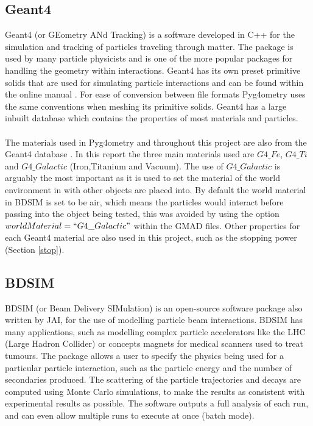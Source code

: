 \documentclass[12pt,a4paper]{article}
\begin{document}
\subsection{Geant4}\label{geant4}
\label{g4}
Geant4 (or GEometry ANd Tracking) is a software developed in C++ for the simulation and tracking of particles traveling through matter. The package is used by many particle physicists and is one of the more popular packages for handling the geometry within interactions. Geant4 has its own preset primitive solids that are used for simulating particle interactions and can be found within the online manual \cite{solids}. For ease of conversion between file formats Pyg4ometry uses the same conventions when meshing its primitive solids. Geant4 has a large inbuilt database which contains the properties of most materials and particles.
\\\\
The materials used in Pyg4ometry and throughout this project are also from the Geant4 database \cite{mater}. In this report the three main materials used are $G4\_Fe$, $G4\_Ti$ and $G4\_Galactic$ (Iron,Titanium and Vacuum). The use of $G4\_Galactic$ is arguably the most important as it is used to set the material of the world environment in with other objects are placed into. By default the world material in BDSIM is set to be air, which means the particles would interact before passing into the object being tested, this was avoided by using the option $worldMaterial=``G4\_Galactic"$ within the GMAD files. Other properties for each Geant4 material are also used in this project, such as the stopping power (Section \ref{stop}). 

\subsection{BDSIM}
\label{bdsim}
BDSIM (or Beam Delivery SIMulation) is an open-source software package also written by JAI, for the use of modelling particle beam interactions. BDSIM has many applications, such as modelling complex particle accelerators like the LHC (Large Hadron Collider) or concepts magnets for medical scanners used to treat tumours. The package allows a user to specify the physics being used for a particular particle interaction, such as the particle energy and the number of secondaries produced. The scattering of the particle trajectories and decays are computed using Monte Carlo simulations, to make the results as consistent with experimental results as possible. The software outputs a full analysis of each run, and can even allow multiple runs to execute at once (batch mode).
\end{document}
